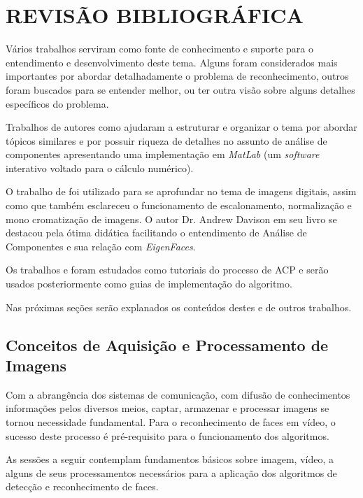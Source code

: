 
\chapter{REVISÃO BIBLIOGRÁFICA}\label{ch:rev-bibs}

Vários trabalhos serviram como fonte de conhecimento e suporte para o entendimento e desenvolvimento deste tema. Alguns foram considerados mais importantes por abordar detalhadamente o problema de reconhecimento, outros foram buscados para se entender melhor, ou ter outra visão sobre alguns detalhes específicos do problema.

Trabalhos de autores como \cite{geysilva} ajudaram a estruturar e organizar o tema por abordar tópicos similares e por possuir riqueza de detalhes no assunto de análise de componentes apresentando uma implementação em \textit{MatLab} (um \textit{software} interativo voltado para o cálculo numérico).

O trabalho de \cite{img-digital-willians} foi utilizado para se aprofundar no tema de imagens digitais, assim como  \cite{gonzalez_woods} que também esclareceu o funcionamento de escalonamento, normalização e mono cromatização de imagens. O autor Dr. Andrew Davison em seu livro \cite{drmathew_java_programming} se destacou pela ótima didática facilitando o entendimento de Análise de Componentes e sua relação com \textit{EigenFaces}. 

Os trabalhos \cite{tutorial_en_smith} e \cite{tutorial_pt} foram estudados como tutoriais do processo de ACP e serão usados posteriormente como guias de implementação do algoritmo.

Nas próximas seções serão explanados os conteúdos destes e de outros trabalhos.


\section{Conceitos de Aquisição e Processamento de Imagens}\label{sec:processamento_imagens}

Com a abrangência dos sistemas de comunicação, com difusão de conhecimentos informações pelos diversos meios, captar, armazenar e processar imagens se tornou necessidade fundamental. Para o reconhecimento de faces em vídeo, o sucesso deste processo é pré-requisito  para o funcionamento dos algoritmos. 

As sessões a seguir contemplam fundamentos básicos sobre imagem, vídeo, a alguns de seus processamentos necessários para a aplicação dos algoritmos de detecção e reconhecimento de faces.


